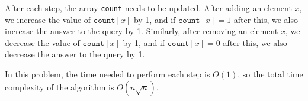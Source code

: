 After each step, the array \texttt{count}
needs to be updated.
After adding an element $x$,
we increase the value of
$\texttt{count}[x]$ by 1,
and if $\texttt{count}[x]=1$ after this,
we also increase the answer to the query by 1.
Similarly, after removing an element $x$,
we decrease the value of
$\texttt{count}[x]$ by 1,
and if $\texttt{count}[x]=0$ after this,
we also decrease the answer to the query by 1.

In this problem, the time needed to perform
each step is $O(1)$, so the total time complexity
of the algorithm is $O(n \sqrt n)$.